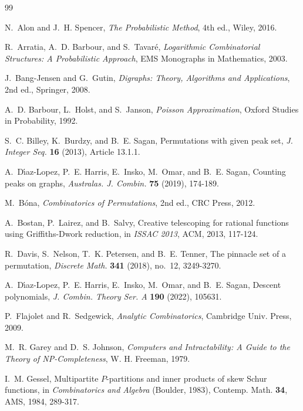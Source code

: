 \documentclass[12pt]{amsart}
\theoremstyle{definition}
\theoremstyle{remark}
\begin{document}
%
%
\begin{thebibliography}{99}

N.~Alon and J.~H. Spencer,
\emph{The Probabilistic Method}, 4th ed.,
Wiley, 2016.

R.~Arratia, A.~D. Barbour, and S.~Tavar\'e,
\emph{Logarithmic Combinatorial Structures: A Probabilistic Approach},
EMS Monographs in Mathematics, 2003.

J.~Bang-Jensen and G.~Gutin,
\emph{Digraphs: Theory, Algorithms and Applications}, 2nd ed.,
Springer, 2008.

A.~D. Barbour, L.~Holst, and S.~Janson,
\emph{Poisson Approximation},
Oxford Studies in Probability, 1992.

S.~C. Billey, K.~Burdzy, and B.~E. Sagan,
Permutations with given peak set,
\emph{J. Integer Seq.} \textbf{16} (2013), Article 13.1.1.

A.~D\'{\i}az-Lopez, P.~E. Harris, E.~Insko, M.~Omar, and B.~E. Sagan,
Counting peaks on graphs,
\emph{Australas. J. Combin.} \textbf{75} (2019), 174-189.

M.~B\'ona,
\emph{Combinatorics of Permutations}, 2nd ed.,
CRC Press, 2012.

A.~Bostan, P.~Lairez, and B.~Salvy,
Creative telescoping for rational functions using Griffiths-Dwork reduction,
in \emph{ISSAC 2013}, ACM, 2013, 117-124.

R.~Davis, S.~Nelson, T.~K. Petersen, and B.~E. Tenner,
The pinnacle set of a permutation,
\emph{Discrete Math.} \textbf{341} (2018), no.~12, 3249-3270.

A.~D\'{\i}az-Lopez, P.~E. Harris, E.~Insko, M.~Omar, and B.~E. Sagan,
Descent polynomials,
\emph{J. Combin. Theory Ser. A} \textbf{190} (2022), 105631.

P.~Flajolet and R.~Sedgewick,
\emph{Analytic Combinatorics},
Cambridge Univ. Press, 2009.

M.~R. Garey and D.~S. Johnson,
\emph{Computers and Intractability: A Guide to the Theory of NP-Completeness},
W. H. Freeman, 1979.

I.~M. Gessel,
Multipartite $P$-partitions and inner products of skew Schur functions,
in \emph{Combinatorics and Algebra} (Boulder, 1983), Contemp. Math. \textbf{34},
AMS, 1984, 289-317.


\end{thebibliography}
\end{document}
